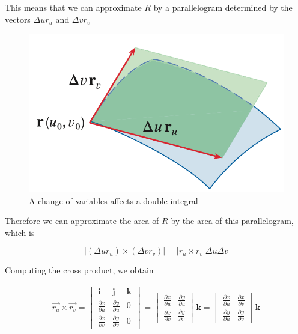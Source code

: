 This means that we can approximate $R$ by a parallelogram determined by the vectors $\Delta u r_u$ and $\Delta v r_v$

\begin{figure}
    \centering
    \includegraphics[scale=0.3]{appendices/figures/fig011.png}
    \caption{A change of variables affects a double integral}
\end{figure}

Therefore we can approximate the area of $R$ by the area of this parallelogram, which is

\begin{equation}
    |(\Delta u r_u) \times (\Delta v r_v)| = |r_u \times r_v| \Delta u \Delta v
\end{equation}

Computing the cross product, we obtain

\begin{align*}
    \vec{r_u} \times \vec{r_v} = 
    \begin{vmatrix}
        \mathbf{i} & \mathbf{j} & \mathbf{k}\\
        \frac{\partial x}{\partial u} & \frac{\partial y}{\partial u} & 0\\
        \frac{\partial x}{\partial v} & \frac{\partial y}{\partial v} & 0
    \end{vmatrix}
     = 
     \begin{vmatrix}
        \frac{\partial x}{\partial u} & \frac{\partial y}{\partial u}\\
        \frac{\partial x}{\partial v} & \frac{\partial y}{\partial v}
    \end{vmatrix}
    \mathbf{k} =
     \begin{vmatrix}
        \frac{\partial x}{\partial u} & \frac{\partial x}{\partial v}\\
        \frac{\partial y}{\partial u} & \frac{\partial y}{\partial v}
    \end{vmatrix}
    \mathbf{k}
\end{align*}

